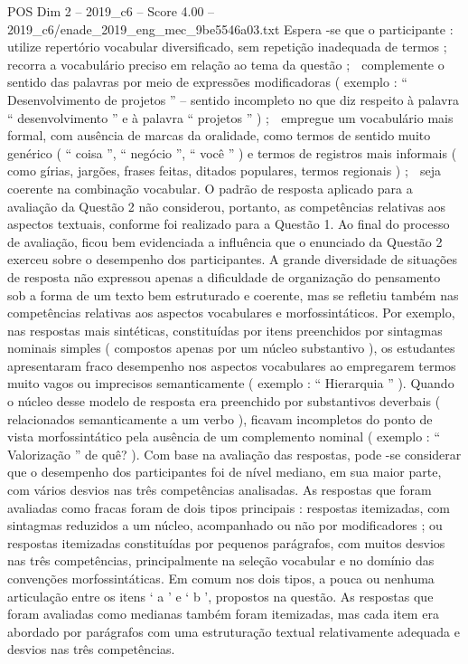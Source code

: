 \begin{textsample}{POS Dim 2 – 2019\_c6 – Score 4.00 – 2019\_c6/enade\_2019\_eng\_mec\_9be5546a03.txt}
Espera -se que o participante :  utilize repertório vocabular diversificado, sem repetição inadequada de termos ;  recorra a vocabulário preciso em relação ao tema da questão ;  complemente o sentido das palavras por meio de expressões modificadoras ( exemplo : “ Desenvolvimento de projetos ” – sentido incompleto no que diz respeito à palavra “ desenvolvimento ” e à palavra “ projetos ” ) ;  empregue um vocabulário mais formal, com ausência de marcas da oralidade, como termos de sentido muito genérico ( “ coisa ”, “ negócio ”, “ você ” ) e termos de registros mais informais ( como gírias, jargões, frases feitas, ditados populares, termos regionais ) ;  seja coerente na combinação vocabular.
O padrão de resposta aplicado para a avaliação da Questão 2 não considerou, portanto, as competências relativas aos aspectos textuais, conforme foi realizado para a Questão 1.
Ao final do processo de avaliação, ficou bem evidenciada a influência que o enunciado da Questão 2 exerceu sobre o desempenho dos participantes.
A grande diversidade de situações de resposta não expressou apenas a dificuldade de organização do pensamento sob a forma de um texto bem estruturado e coerente, mas se refletiu também nas competências relativas aos aspectos vocabulares e morfossintáticos.
Por exemplo, nas respostas mais sintéticas, constituídas por itens preenchidos por sintagmas nominais simples ( compostos apenas por um núcleo substantivo ), os estudantes apresentaram fraco desempenho nos aspectos vocabulares ao empregarem termos muito vagos ou imprecisos semanticamente ( exemplo : “ Hierarquia ” ).
Quando o núcleo desse modelo de resposta era preenchido por substantivos deverbais ( relacionados semanticamente a um verbo ), ficavam incompletos do ponto de vista morfossintático pela ausência de um complemento nominal ( exemplo : “ Valorização ” de quê? ).
Com base na avaliação das respostas, pode -se considerar que o desempenho dos participantes foi de nível mediano, em sua maior parte, com vários desvios nas três competências analisadas.
As respostas que foram avaliadas como fracas foram de dois tipos principais : respostas itemizadas, com sintagmas reduzidos a um núcleo, acompanhado ou não por modificadores ; ou respostas itemizadas constituídas por pequenos parágrafos, com muitos desvios nas três competências, principalmente na seleção vocabular e no domínio das convenções morfossintáticas.
Em comum nos dois tipos, a pouca ou nenhuma articulação entre os itens ‘ a ’ e ‘ b ’, propostos na questão.
As respostas que foram avaliadas como medianas também foram itemizadas, mas cada item era abordado por parágrafos com uma estruturação textual relativamente adequada e desvios nas três competências.

\end{textsample}
